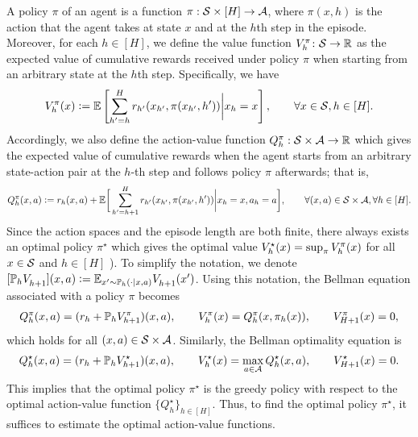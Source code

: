 A policy $\pi$ of an agent is a function $\pi: \mathcal{S} \times [H] \rightarrow \mathcal{A}$, where  $\pi(x, h)$ is the action that the agent takes at state $x$ and at the $h$th step in the episode. 
Moreover, for each $h\in [H]$, we define the value function $V_h^{\pi}\colon \mathcal{S} \to \mathbb{R} $ as the expected value of cumulative  rewards received under policy $\pi$ when starting from an arbitrary state at the $h$th step. Specifically, we have 
\begin{equation*}%
 \sind{V}{\pi}{h}(x) \defeq \E\left[\sum_{h' = h}^H r_{h'}(x_{h'}, \pi(x_{h'}, h'))  \bigg | x_h = x\right], \qquad \forall x\in \cS, h \in [H].
\end{equation*}
Accordingly, we also define the action-value function  ${Q}^{\pi}_{h}:\mathcal{S} \times \mathcal{A} \to \mathbb{R}$ which gives the expected value of cumulative  rewards when the agent starts  from an  arbitrary state-action pair at the $h$-th step and follows  policy $\pi$ afterwards; that is, 
\begin{equation*}
 {Q}^{\pi}_{h}(x,a) \mathrel{\mathop:}= r_h(x, a) + \mathbb{E}  \bigg[\sum_{h' = h+1}^H r_{h'}(x_{h'}, \pi(x_{h'}, h')) \bigg  | x_h = x, a_h = a \bigg], \qquad \forall (x,a) \in \mathcal{S}\times \mathcal{A}, \forall h \in [H] .
\end{equation*}
Since the action spaces and the episode length are both finite, there always exists 
 an optimal policy $\pi^\star$ which gives the optimal value ${V}^{\star}_{h}(x) = \sup_{\pi} V_h^\pi(x)$ for all $x\in \mathcal{S}$ and $h\in [H]$ \cite[see, e.g.,][]{puterman2014markov}).
To simplify the notation,  we denote  $[\mathbb{P}_h{V}^{}_{h+1}](x, a) \mathrel{\mathop:}= \mathbb{E}_{x' \sim \mathbb{P}_h(\cdot|x, a)}{V}^{}_{h+1}(x')$. Using this notation, the   Bellman equation associated with a policy $\pi$ becomes 
\begin{align} \label{eq:bellman} 
    {Q}^{\pi}_{h}(x, a) = (r_h + \mathbb{P}_h {V}^{\pi}_{h+1})(x, a) , \qquad   {V}^{\pi}_{h}(x) = {Q}^{\pi}_{h}(x, \pi_h(x)),    
    \qquad {V}^{\pi}_{H+1}(x) = 0,  
\end{align}
which holds for all  $(x,a) \in \mathcal{S} \times \mathcal{A} $. Similarly, the Bellman optimality equation is 
\begin{align}\label{eq:opt_bellman}
  {Q}^{\star}_{h}(x, a) = (r_h + \mathbb{P}_h {V}^{\star}_{h+1})(x, a) , \qquad 
 {V}^{\star}_{h}(x) = \max_{a\in\mathcal{A}}{Q}^{\star}_{h}(x, a), \qquad {V}^{\star}_{H+1}(x) = 0. 
\end{align}
This implies that the optimal policy $\pi^\star$ is the greedy policy with respect to the optimal action-value function $\{ Q^\star _h \}_{h \in [H]}$. Thus, to find the optimal policy $\pi^\star$, it suffices to estimate  the optimal action-value functions. 

